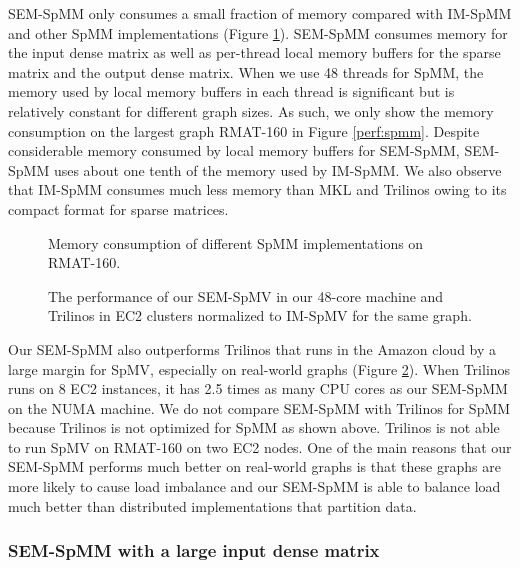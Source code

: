 SEM-SpMM only consumes a small fraction of memory compared with IM-SpMM and
other SpMM implementations (Figure \ref{perf:spmm_mem}). SEM-SpMM consumes
memory for the input dense matrix as well as per-thread local memory buffers
for the sparse matrix and the output dense matrix. When we use 48 threads for
SpMM, the memory used by local memory buffers in each thread is significant
but is relatively constant for different graph sizes. As such, we only show
the memory consumption on the largest graph RMAT-160 in Figure \ref{perf:spmm}.
Despite considerable memory consumed by
local memory buffers for SEM-SpMM, SEM-SpMM uses about one tenth of the memory
used by IM-SpMM. We also observe that IM-SpMM consumes much less memory than
MKL and Trilinos owing to its compact format for sparse matrices.

\begin{figure}
	\begin{center}
		\footnotesize
		
		\caption{Memory consumption of different SpMM implementations on
		RMAT-160.}
		\label{perf:spmm_mem}
	\end{center}
\end{figure}

\begin{figure}
	\begin{center}
		\footnotesize
		
		\caption{The performance of our SEM-SpMV in our 48-core machine
		and Trilinos in EC2 clusters normalized to IM-SpMV for the same graph.}
		\label{perf:ec2}
	\end{center}
\end{figure}

Our SEM-SpMM also outperforms Trilinos that runs in the Amazon cloud by a large
margin for SpMV, especially on real-world graphs (Figure \ref{perf:ec2}).
When Trilinos runs on 8 EC2 instances, it has 2.5 times as many CPU cores as
our SEM-SpMM on the NUMA machine. We do not compare SEM-SpMM with Trilinos
for SpMM because Trilinos is not optimized for SpMM as shown above. Trilinos
is not able to run SpMV on RMAT-160 on two EC2 nodes.
One of the main reasons that our SEM-SpMM performs much
better on real-world graphs is that these graphs are more likely to cause
load imbalance and our SEM-SpMM is able to balance load much better than
distributed implementations that partition data.

\subsubsection{SEM-SpMM with a large input dense matrix}

